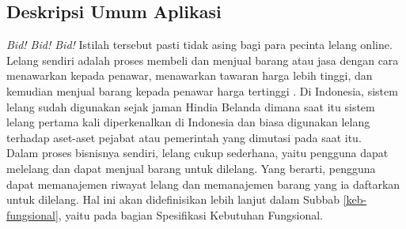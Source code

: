 \subsection{Deskripsi Umum Aplikasi}
	\label{deskripsi-umum-app}

	\textit{Bid! Bid! Bid!} Istilah tersebut pasti tidak asing bagi para pecinta lelang online. Lelang sendiri adalah proses membeli dan menjual barang atau jasa dengan cara menawarkan kepada penawar, menawarkan tawaran harga lebih tinggi, dan kemudian menjual barang kepada penawar harga tertinggi \cite{wikipedia_lelang_2017}.  Di Indonesia, sistem lelang sudah digunakan sejak jaman Hindia Belanda dimana saat itu sistem lelang pertama kali diperkenalkan di Indonesia dan biasa digunakan lelang terhadap aset-aset pejabat atau pemerintah yang dimutasi pada saat itu. \\	 	
	\indent Dalam proses bisnisnya sendiri, lelang cukup sederhana, yaitu pengguna dapat melelang dan dapat menjual barang untuk dilelang. Yang berarti, pengguna dapat memanajemen riwayat lelang dan memanajemen barang yang ia daftarkan untuk dilelang. Hal ini akan didefinisikan lebih lanjut dalam Subbab \ref{keb-fungsional}, yaitu pada bagian Spesifikasi Kebutuhan Fungsional.
